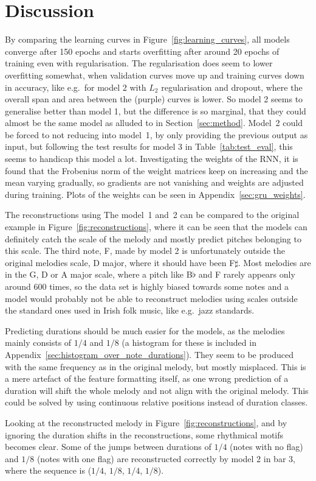 \section{Discussion}
\label{sec:discussion}

By comparing the learning curves in Figure~\ref{fig:learning_curves}, all models converge after 150 epochs and starts overfitting after around 20 epochs of training even with regularisation. The regularisation does seem to lower overfitting somewhat, when validation curves move up and training curves down in accuracy, like e.g.\ for model 2 with $L_2$ regularisation and dropout, where the overall span and area between the (purple) curves is lower. So model 2 seems to generalise better than model 1, but the difference is so marginal, that they could almost be the same model as alluded to in Section~\ref{sec:method}.
Model~2 could be forced to not reducing into model~1, by only providing the previous output as input, but following the test results for model 3 in Table~\ref{tab:test_eval}, this seems to handicap this model a lot.
Investigating the weights of the RNN, it is found that the Frobenius norm of the weight matrices keep on increasing and the mean varying gradually, so gradients are not vanishing and weights are adjusted during training.
Plots of the weights can be seen in Appendix~\ref{sec:gru_weights}.

The reconstructions using The model~1 and~2 can be compared to the original example in Figure~\ref{fig:reconstructions}, where it can be seen that the models can definitely catch the scale of the melody and mostly predict pitches belonging to this scale.
The third note, F, made by model 2 is unfortunately outside the original melodies scale, D major, where it should have been F$\sharp$. Most melodies are in the G, D or A major scale, where a pitch like B$\flat$ and F rarely appears only around 600 times, so the data set is highly biased towards some notes and a model would probably not be able to reconstruct melodies using scales outside the standard ones used in Irish folk music, like e.g.\ jazz standards.   

Predicting durations should be much easier for the models, as the melodies mainly consists of $1/4$ and $1/8$ (a histogram for these is included in Appendix~\ref{sec:histogram_over_note_durations}).
They seem to be produced with the same frequency as in the original melody, but mostly misplaced. This is a mere artefact of the feature formatting itself, as one wrong prediction of a duration will shift the whole melody and not align with the original melody. This could be solved by using continuous relative positions instead of duration classes. 

Looking at the reconstructed melody in Figure~\ref{fig:reconstructions}, and
by ignoring the duration shifts in the reconstructions, some rhythmical motifs becomes clear. Some of the jumps between durations of $1/4$ (notes with no flag) and $1/8$ (notes with one flag) are reconstructed correctly by model 2 in bar 3, where the sequence is ($1/4$, $1/8$, $1/4$, $1/8$). 
